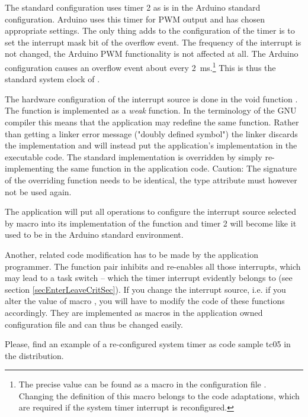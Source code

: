 The \rtos{} standard configuration uses timer 2 as is in the Arduino
standard configuration. Arduino uses this timer for PWM output and has
chosen appropriate settings. The only thing \rtos{} adds to the
configuration of the timer is to set the interrupt mask bit of the
overflow event. The frequency of the interrupt is not changed, the Arduino
PWM functionality is not affected at all. The Arduino configuration causes
an overflow event about every 2~ms.\footnote{The precise value can be
found as a macro in the \rtos{} configuration file .
Changing the definition of this macro belongs to the code adaptations,
which are required if the system timer interrupt is reconfigured.} This is
thus the standard system clock of \rtos{}.

The hardware configuration of the interrupt source is done in the void
function . The function is
implemented as a \emph{weak} function. In the terminology of the GNU
compiler this means that the application may redefine the same function.
Rather than getting a linker error message ("doubly defined symbol") the
linker discards the \rtos{} implementation and will instead put the
application's implementation in the executable code. The standard
implementation is overridden by simply re-implementing the same function
in the application code. Caution: The signature of the overriding function
needs to be identical, the type attribute  must however not be
used again.

The application will put all operations to configure the interrupt source
selected by macro  into its
implementation of the function and timer 2 will become like it used to be
in the Arduino standard environment.

Another, related code modification has to be made by the application
programmer. The function pair
 inhibits and
re-enables all those interrupts, which may lead to a task switch -- which
the timer interrupt evidently belongs to (see section
\ref{secEnterLeaveCritSec}). If you change the interrupt source, i.e. if
you alter the value of macro , you
will have to modify the code of these functions accordingly. They are
implemented as macros in the application owned configuration file
 and can thus be changed easily.

Please, find an example of a re-configured system timer as code sample
tc05 in the \rtos{} distribution.


